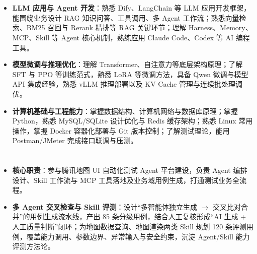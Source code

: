\documentclass[10pt]{article}
\begin{document}
    \ResumeContactBar
    \ResumeProfileAndEducation


    \section[专业技能]{}
    \begin{itemize}
        \item \textbf{LLM 应用与 Agent 开发}：熟悉 Dify、LangChain 等 LLM 应用开发框架，能围绕业务设计 RAG 知识问答、工具调用、多 Agent 工作流；熟悉向量检索、BM25 召回与 Rerank 精排等 RAG 关键环节；理解 Harness、Memory、MCP、Skill 等 Agent 核心机制，熟练应用 Claude Code、Codex 等 AI 编程工具。
        \item \textbf{模型微调与推理优化}：理解 Transformer、自注意力等底层架构原理；了解 SFT 与 PPO 等训练范式，熟悉 LoRA 等微调方法，具备 Qwen 微调与模型 API 集成经验，熟悉 vLLM 推理部署以及 KV Cache 管理与连续批处理调优。
        \item \textbf{计算机基础与工程能力}：掌握数据结构、计算机网络与数据库原理；掌握 Python，熟悉 MySQL/SQLite 设计优化与 Redis 缓存架构；熟悉 Linux 常用操作，掌握 Docker 容器化部署与 Git 版本控制；了解测试理论，能用 Postman/JMeter 完成接口联调与压测。
    \end{itemize}


    \section[实习经历]{}

    \begin{itemize}
        \item \textbf{核心职责}：参与腾讯地图 UI 自动化测试 Agent 平台建设，负责 Agent 编排设计、Skill 工作流与 MCP 工具落地及业务域用例生成，打通测试业务全流程。
        \item \textbf{多 Agent 交叉检查与 Skill 评测}：设计“多智能体独立生成 $\rightarrow$ 交叉比对合并”的用例生成流水线，产出 85 条分级用例，结合人工复核形成“AI 生成 + 人工质量判断”闭环；为地图数据查询、地图渲染两类 Skill 规划 120 条评测用例，覆盖能力调用、参数边界、异常输入与安全约束，沉淀 Agent/Skill 能力评测方法论。
    \end{itemize}
\end{document}
